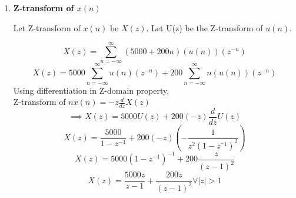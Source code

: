 \documentclass[journal,12pt,twocolumn]{IEEEtran}
\theoremstyle{remark}
\begin{document}
\begin{enumerate}
\item \textbf{Z-transform of $x(n)$}

Let Z-transform of $x(n)$ be $X(z)$. Let U(z) be the Z-transform of $u(n)$.

\[X(z) = \sum_{n = -\infty}^{\infty} (5000 + 200n)(u(n))(z^{-n})\]
\[X(z) = 5000\sum_{n = -\infty}^{\infty} u(n)(z^{-n}) + 200\sum_{n = -\infty}^{\infty}n(u(n))(z^{-n})\]
Using differentiation in Z-domain property,\\Z-transform of $nx(n) = -z\frac{d}{dz}X(z)$
\[\implies X(z) = 5000U(z) + 200(-z)\frac{d}{dz} U(z)\]
\[X(z) = \frac{5000}{1 - z^{-1}} + 200(-z)(-\frac{1}{z^2(1-z^{^-1})^2})\]
\[X(z) = 5000(1 - z^{-1})^{-1} + 200\frac{z}{(z - 1)^2}\]
\[X(z) = \frac{5000z}{z - 1} + \frac{200z}{(z - 1)^2} \forall |z| > 1\]

\end{enumerate}
\end{document}
